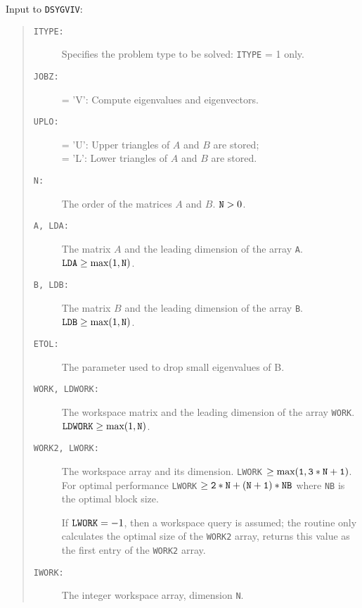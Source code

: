 \documentclass[11pt]{article}
\begin{document}
Input to {\tt DSYGVIV}: 
\begin{quote} 
\begin{description} 
\item[{\tt ITYPE:}] Specifies the problem type to be solved:
                    {\tt ITYPE} = 1 only.
\item[{\tt JOBZ:}]  = 'V': Compute eigenvalues and eigenvectors.
\item[{\tt UPLO:}]  = 'U': Upper triangles of $A$ and $B$ are stored;\\
                    = 'L': Lower triangles of $A$ and $B$ are stored.
\item[{\tt N:}] The order of the matrices $A$ and $B$. ${\tt N} > 0$.
\item[{\tt A, LDA:}] The matrix $A$ and the leading dimension 
         of the array {\tt A}. ${\tt LDA} \ge \mbox{max}(1,{\tt N})$.
\item[{\tt B, LDB:}] The matrix $B$ and
                     the leading dimension of the array {\tt B}. 
                     ${\tt LDB} \ge \mbox{max}(1,{\tt N})$.
\item[{\tt ETOL:}] The parameter used to drop small eigenvalues of B.
\item[{\tt WORK, LDWORK:}] The workspace matrix and the leading dimension
                           of the array {\tt WORK}. 
                           ${\tt LDWORK} \ge \mbox{max}(1,{\tt N})$.
\item[{\tt WORK2, LWORK:}] The workspace array and its dimension. 
                           {\tt LWORK} $ \ge 
                           \mbox{max}({\tt 1, 3 * N + 1})$.
                           For optimal performance {\tt LWORK} $\ge {\tt 2*N+(N+1)*NB}$
                           where {\tt NB} is the optimal block size.
                           
                           If ${\tt LWORK} = -1$, then a workspace query is
                           assumed; the routine only calculates the optimal 
                           size of the {\tt WORK2} array, returns this value 
                           as the first entry of the {\tt WORK2} array.
\item[{\tt IWORK:}] The integer workspace array, dimension {\tt N}.
\end{description} 
\end{quote} 
\end{document}
